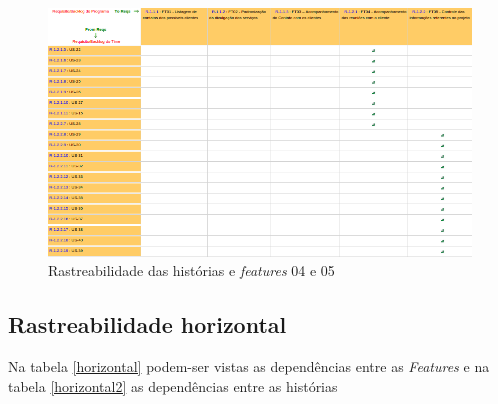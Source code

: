 \begin{figure}[!htb]
 \centering
 \includegraphics[scale= 0.8]{figuras/ft04e05.png}
 \caption{Rastreabilidade das histórias e \textit{features} 04 e 05}
 \label{fig:ft04}
\end{figure}
% 

% 

\subsection{Rastreabilidade horizontal}

Na tabela \ref{horizontal} podem-ser vistas as dependências entre as \textit{Features} e na tabela \ref{horizontal2} as dependências
entre as histórias

